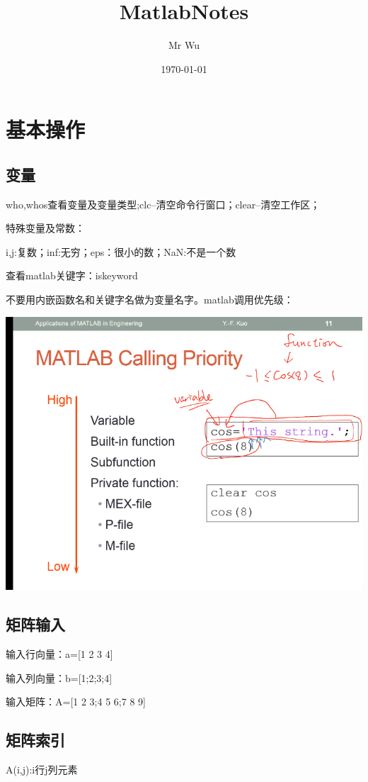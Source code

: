 \documentclass{ctexart}
\title{MatlabNotes}
\author{Mr Wu}
\date{\today}
\begin{document}
	\maketitle
	\section{基本操作}
	\subsection{变量}
	who,whos查看变量及变量类型;clc--清空命令行窗口；clear--清空工作区；
	
	特殊变量及常数：
	
	i,j:复数；inf:无穷；eps：很小的数；NaN:不是一个数
	
	查看matlab关键字：iskeyword
	
	不要用内嵌函数名和关键字名做为变量名字。matlab调用优先级：
	
	\includegraphics[scale=0.6]{1}
	
	\subsection{矩阵输入}
	输入行向量：a=[1 2 3 4]
	
	输入列向量：b=[1;2;3;4]
	
	输入矩阵：A=[1 2 3;4 5 6;7 8 9]
	
	\subsection{矩阵索引}
	A(i,j):i行j列元素
	
\end{document}
